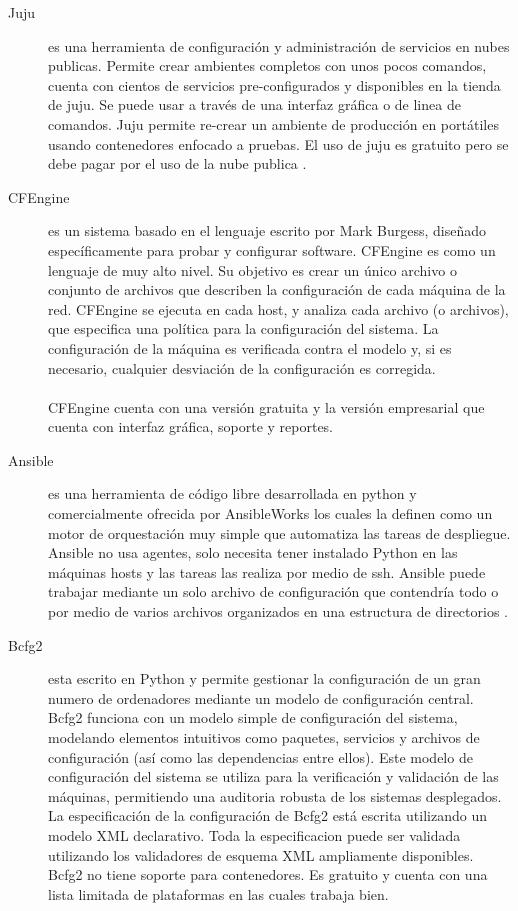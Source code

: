 \documentclass[conference, spanish]{IEEEtran}
\begin{document}
\begin{description}
\item [Juju]
 es una herramienta de configuración y administración de servicios en nubes publicas. Permite crear ambientes completos con unos pocos comandos, cuenta con cientos de servicios pre-configurados y disponibles en la tienda de juju. Se puede usar a través de una interfaz gráfica o de linea de comandos. Juju permite re-crear un ambiente de producción en portátiles usando contenedores enfocado a pruebas. El uso de juju es gratuito pero se debe pagar por el uso de la nube publica \cite{juju16}.

\item [CFEngine]
es un sistema basado en el lenguaje escrito por Mark Burgess, diseñado específicamente para probar y configurar software. CFEngine es como un lenguaje de muy alto nivel. Su objetivo es crear un único archivo o conjunto de archivos que describen la configuración de cada máquina de la red. CFEngine se ejecuta en cada host, y analiza cada archivo (o archivos), que especifica una política para la configuración del sistema. La configuración de la máquina es verificada contra el modelo y, si es necesario, cualquier desviación de la configuración es corregida. \cite{cfengine15}\\
\\
CFEngine cuenta con una versión gratuita y la versión empresarial que cuenta con interfaz gráfica, soporte y reportes.

\item [Ansible]
es una herramienta de código libre desarrollada en python y comercialmente ofrecida por AnsibleWorks los cuales la definen como un motor de orquestación muy simple que automatiza las tareas de despliegue. Ansible no usa agentes, solo necesita tener instalado Python en las máquinas hosts y las tareas las realiza por medio de ssh. Ansible puede trabajar mediante un solo archivo de configuración que contendría todo o por medio de varios archivos organizados en una estructura de directorios \cite{ans16}. 

\item [Bcfg2]
esta escrito en Python y permite gestionar la configuración de un gran numero de ordenadores mediante un modelo de configuración central. Bcfg2 funciona con un modelo simple de configuración del sistema, modelando elementos intuitivos como paquetes, servicios y archivos de configuración (así como las dependencias entre ellos). Este modelo de configuración del sistema se utiliza para la verificación  y validación de las máquinas, permitiendo una auditoria robusta de los sistemas desplegados. La especificación de la configuración de Bcfg2 está escrita utilizando un modelo XML declarativo. Toda la especificacion puede ser validada utilizando los validadores de esquema XML ampliamente disponibles. Bcfg2 no tiene soporte para contenedores. Es gratuito y cuenta con una lista limitada de plataformas en las cuales trabaja bien.\cite{bdfg215}


\end{description}
\end{document}

